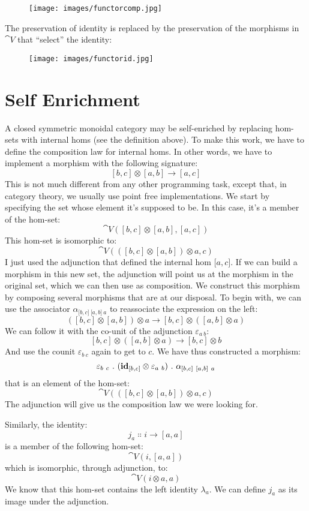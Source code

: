 \begin{figure}[H]
\centering
\texttt{[image: images/functorcomp.jpg]}
\end{figure}

\noindent
The preservation of identity is replaced by the preservation of the
morphisms in $\cat{V}$ that ``select'' the identity:

\begin{figure}[H]
\centering
\texttt{[image: images/functorid.jpg]}
\end{figure}

\section{Self Enrichment}

A closed symmetric monoidal category may be self-enriched by replacing
hom-sets with internal homs (see the definition above). To make this
work, we have to define the composition law for internal homs. In other
words, we have to implement a morphism with the following signature:
\[[b, c] \otimes [a, b] \to [a, c]\]
This is not much different from any other programming task, except that,
in category theory, we usually use point free implementations. We start
by specifying the set whose element it's supposed to be. In this case,
it's a member of the hom-set:
\[\cat{V}([b, c] \otimes [a, b], [a, c])\]
This hom-set is isomorphic to:
\[\cat{V}(([b, c] \otimes [a, b]) \otimes a, c)\]
I just used the adjunction that defined the internal hom
${[}a, c{]}$. If we can build a morphism in this new set, the
adjunction will point us at the morphism in the original set, which we
can then use as composition. We construct this morphism by composing
several morphisms that are at our disposal. To begin with, we can use
the associator $\alpha_{{[}b, c{]}\ {[}a, b{]}\ a}$ to reassociate the
expression on the left:
\[([b, c] \otimes [a, b]) \otimes a \to [b, c] \otimes ([a, b] \otimes a)\]
We can follow it with the co-unit of the adjunction $\varepsilon_{a\ b}$:
\[[b, c] \otimes ([a, b] \otimes a) \to [b, c] \otimes b\]
And use the counit $\varepsilon_{b\ c}$ again to get to $c$. We have
thus constructed a morphism:
\[\varepsilon_{b\ c}\ .\ (\idarrow[{[b, c]}] \otimes \varepsilon_{a\ b})\ .\ \alpha_{[b, c]\ [a, b]\ a}\]
that is an element of the hom-set:
\[\cat{V}(([b, c] \otimes [a, b]) \otimes a, c)\]
The adjunction will give us the composition law we were looking for.

Similarly, the identity:
\[j_a \Colon i \to [a, a]\]
is a member of the following hom-set:
\[\cat{V}(i, [a, a])\]
which is isomorphic, through adjunction, to:
\[\cat{V}(i \otimes a, a)\]
We know that this hom-set contains the left identity $\lambda_a$. We can
define $j_a$ as its image under the adjunction.

